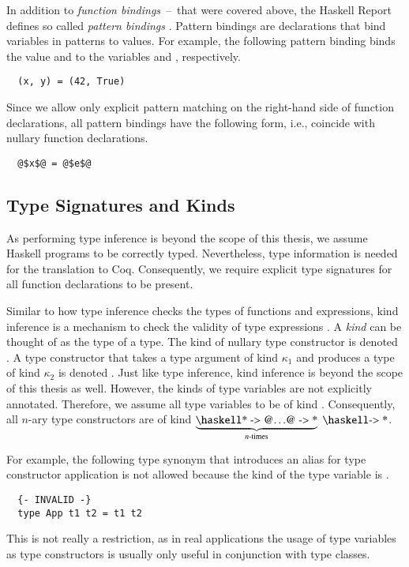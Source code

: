 In addition to \textit{function bindings}~--~that were covered above, the Haskell Report defines so called \textit{pattern bindings} \cite[p.~53]{Marlow:2010}.
Pattern bindings are declarations that bind variables in patterns to values.
For example, the following pattern binding binds the value  and  to the variables  and , respectively.
\begin{verbatim}
  (x, y) = (42, True)
\end{verbatim}
Since we allow only explicit pattern matching on the right-hand side of function declarations, all pattern bindings have the following form, i.e., coincide with nullary function declarations.
\begin{verbatim}
  @$x$@ = @$e$@
\end{verbatim}

\subsection{Type Signatures and Kinds} \label{sec:preliminaries:assumptions:type-sigs}
As performing type inference is beyond the scope of this thesis,
we assume Haskell programs to be correctly typed.
Nevertheless, type information is needed for the translation to Coq.
Consequently, we require explicit type signatures for all function declarations to be present.

Similar to how type inference checks the types of functions and expressions, kind inference is a mechanism to check the validity of type expressions \cite[p.~37]{Marlow:2010}.
A \textit{kind} can be thought of as the type of a type.
The kind of nullary type constructor is denoted \haskell{*}.
A type constructor that takes a type argument of kind $\kappa_1$ and produces a type of kind $\kappa_2$ is denoted .
Just like type inference, kind inference is beyond the scope of this thesis as well.
However, the kinds of type variables are not explicitly annotated.
Therefore, we assume all type variables to be of kind \haskell{*}.
Consequently, all $n$-ary type constructors are of kind $\underbrace{\haskellM{* -> @$\ldots$@ -> *}}_{n\text{-times}}\;\haskellM{-> *}$.

For example, the following type synonym that introduces an alias for type constructor application is not allowed because the kind of the type variable  is \haskell{* -> *}.
\begin{verbatim}
  {- INVALID -}
  type App t1 t2 = t1 t2
\end{verbatim}
This is not really a restriction, as in real applications the usage of type variables as type constructors is usually only useful in conjunction with type classes.

